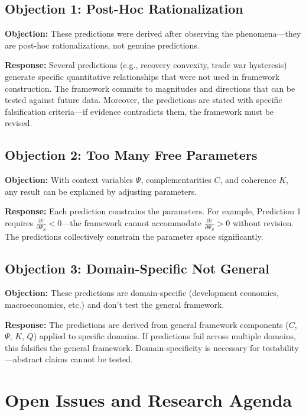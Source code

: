 \subsection{Objection 1: Post-Hoc Rationalization}

\textbf{Objection:} These predictions were derived after observing the phenomena---they are post-hoc rationalizations, not genuine predictions.

\textbf{Response:} Several predictions (e.g., recovery convexity, trade war hysteresis) generate specific quantitative relationships that were not used in framework construction. The framework commits to magnitudes and directions that can be tested against future data. Moreover, the predictions are stated with specific falsification criteria---if evidence contradicts them, the framework must be revised.

\subsection{Objection 2: Too Many Free Parameters}

\textbf{Objection:} With context variables $\Psi$, complementarities $C$, and coherence $K$, any result can be explained by adjusting parameters.

\textbf{Response:} Each prediction constrains the parameters. For example, Prediction 1 requires $\frac{\partial \tau}{\partial \Psi_S} < 0$---the framework cannot accommodate $\frac{\partial \tau}{\partial \Psi_S} > 0$ without revision. The predictions collectively constrain the parameter space significantly.

\subsection{Objection 3: Domain-Specific Not General}

\textbf{Objection:} These predictions are domain-specific (development economics, macroeconomics, etc.) and don't test the general framework.

\textbf{Response:} The predictions are derived from general framework components ($C$, $\Psi$, $K$, $Q$) applied to specific domains. If predictions fail across multiple domains, this falsifies the general framework. Domain-specificity is necessary for testability---abstract claims cannot be tested.


\section{Open Issues and Research Agenda}
\label{sec:S-open}

